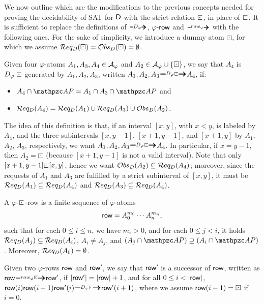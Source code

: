 We now outline which are the modifications to the previous concepts needed for proving the 
decidability of SAT for $\mathsf{D}${} with the strict relation $\ssubint$, in place of $\sqsubset$.
It is sufficient to replace the definitions
of $\genDphi$,  $\varphi$-$\text{{\sffamily row}}$ and $\rownext$
with the following ones. 
For the sake of simplicity, we introduce a dummy atom $\boxdot$, for which we assume $\mathcal{R} eq_D(\boxdot)=\mathcal{O} bs_D(\boxdot)=\emptyset$.

\begin{definition}\label{def:d_generatorS}
Given four $\varphi$-atoms $A_1, A_3,A_4\in\mathcal{A}_{\varphi}$ and $A_2\in\mathcal{A}_{\varphi}\cup\{\boxdot\}$, we say that 
$A_4$ is \mbox{$\Dphi\ssubint$-generated} by $A_1,A_2,A_3$,
written $A_1,A_2, A_3\genDphiS A_4$, if:  
\begin{itemize}
    \item $A_4\cap\AP = A_1 \cap A_3 \cap \AP$ and 
    \item $\mathcal{R} eq_D(A_4)=\mathcal{R} eq_D(A_1)\cup \mathcal{R} eq_D(A_3) \cup \mathcal{O} bs_D(A_2 )$.
\end{itemize}
\end{definition}
The idea of this definition is that, if an interval $[x,y]$, with $x<y$, is labeled by $A_4$, and the three subintervals $[x,y-1]$, $[x+1,y-1]$, and $[x+1,y]$ by $A_1$, $A_2$, $A_3$, respectively, we want $A_1,A_2, A_3\genDphiS A_4$. In particular, if $x=y-1$, then $A_2=\boxdot$ (because $[x+1,y-1]$ is not a valid interval). Note that only $[x+1,y-1]\ssubint[x,y]$, hence we want $\mathcal{O} bs_D(A_2)\subseteq\mathcal{R} eq_D(A_4)$; moreover, since the requests of $A_1$ and $A_3$ are fulfilled by a strict subinterval of $[x,y]$, it must be $\mathcal{R} eq_D(A_1)\subseteq\mathcal{R} eq_D(A_4)$ and $\mathcal{R} eq_D(A_3)\subseteq\mathcal{R} eq_D(A_4)$. 

\begin{definition}\label{def:rowS}
A $\varphi$-$\ssubint$-row is a finite sequence of $\varphi$-atoms \[\text{{\sffamily row}}=A_0^{m_0}\cdots A_n^{m_n},\]
such that for each $0\leq i \leq n$, we have $m_i>0$, and for each $0\leq j<i$, it holds $\mathcal{R} eq_D(A_j) \subseteq \mathcal{R} eq_D (A_i)$, $A_i \neq A_j$, and $(A_j\cap \AP)\supseteq (A_i\cap \AP)$.
 Moreover, $\mathcal{R} eq_D(A_0)=\emptyset$.
\end{definition}

\begin{definition}\label{def:rownextS}
Given two $\varphi$-rows $\text{{\sffamily row}}$ and $\text{{\sffamily row}}'$, we say that $\text{{\sffamily row}}'$ is a successor
of $\text{{\sffamily row}}$, written as $\row\rownextS\row'$, if $|\text{{\sffamily row}}'| = |\text{{\sffamily row}}| +1$, and for all $0\leq i < |\text{{\sffamily row}}|$,
$\row(i)\row(i-1)\row'(i) \genDphiS \row'(i+1)$, where we assume 
$\text{{\sffamily row}}(i-1)=\boxdot$ if $i=0$. 
\end{definition}

